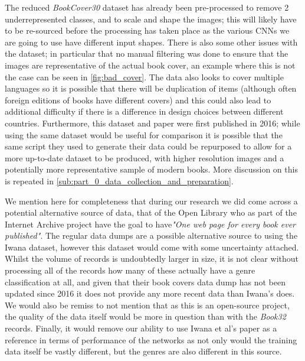 \documentclass[12pt]{article}
\numberwithin{equation}{section}
\numberwithin{figure}{section}
\begin{document}
The reduced \emph{BookCover30} dataset has already been pre-processed to remove 2 underrepresented classes, and to scale and shape the images; this will likely have to be re-sourced before the processing has taken place as the various CNNs we are going to use have different input shapes. There is also some other issues with the dataset; in particular that no manual filtering was done to ensure that the images are representative of the actual book cover, an example where this is not the case can be seen in \cref{fig:bad_cover}. The data also looks to cover multiple languages so it is possible that there will be duplication of items (although often foreign editions of books have different covers) and this could also lead to additional difficulty if there is a difference in design choices between different countries. Furthermore, this dataset and paper were first published in 2016; while using the same dataset would be useful for comparison it is possible that the same script they used to generate their data could be repurposed to allow for a more up-to-date dataset to be produced, with higher resolution images and a potentially more representative sample of modern books. More discussion on this is repeated in \cref{sub:part_0_data_collection_and_preparation}. 

We mention here for completeness that during our research we did come across a potential alternative source of data, that of the Open Library \cite{openAbout} who as part of the Internet Archive project have the goal to have\emph{"One web page for every book ever published"}. The regular data dumps \cite{openDataDumps} are a possible alternative source to using the Iwana dataset, however this dataset would come with some uncertainty attached. Whilst the volume of records is undoubtedly larger in size, it is not clear without processing all of the records how many of these actually have a genre classification at all, and given that their book covers data dump has not been updated since 2016 it does not provide any more recent data than Iwana's does. We would also be remiss to not mention that as this is an open-source project, the quality of the data itself would be more in question than with the \emph{Book32} records. Finally, it would remove our ability to use Iwana et al's paper as a reference in terms of performance of the networks as not only would the training data itself be vastly different, but the genres are also different in this source.
\end{document}
